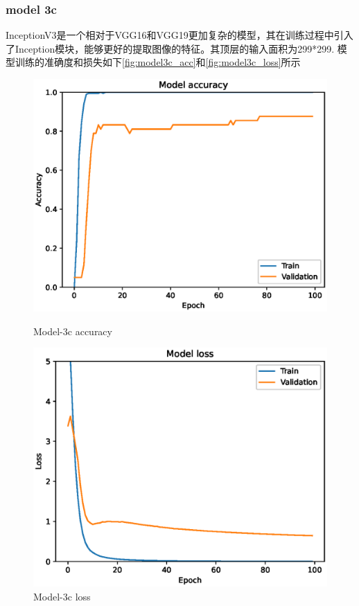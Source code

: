 \subsubsection{model 3c}
InceptionV3是一个相对于VGG16和VGG19更加复杂的模型，其在训练过程中引入了Inception模块，能够更好的提取图像的特征。其顶层的输入面积为299*299.
模型训练的准确度和损失如下\autoref{fig:model3c_acc}和\autoref{fig:model3c_loss}所示

\begin{figure}
    \centering
    \begin{minipage}{0.45\textwidth}
        \centering
        \includegraphics[width=\textwidth]{./fig/model3/accuracy3c.eps}
        \caption{Model-3c accuracy}
        \label{fig:model3c_acc}
    \end{minipage}
    \begin{minipage}{0.45\textwidth}
        \centering
        \includegraphics[width=\textwidth]{./fig/model3/loss3c.eps}
        \caption{Model-3c loss}
        \label{fig:model3c_loss}
    \end{minipage}
\end{figure}

